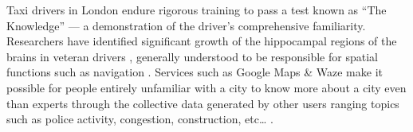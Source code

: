 \documentclass[trackingWork]{subfiles}
\begin{document}
Taxi drivers in London endure rigorous training to pass a test known as ``The Knowledge''
--- a demonstration of the driver's comprehensive familiarity.
Researchers have identified significant growth of
the hippocampal regions of the brains in veteran drivers%
, generally understood to be responsible for spatial functions such as navigation
\cite{Maguire11042000,Maguire2894,Skok:1999:KML:299513.299625%
,       skok2000managing,Woollett1407,woollett2011acquiring}.
Services such as Google Maps \& Waze make it possible for
people entirely unfamiliar with a city
to know more about a city even than experts through
the collective data generated by other users
ranging topics such as police activity, congestion, construction, etc\dots
\cite{silva2013traffic,hind2014outsmarting}.




\onlyinsubfile{
  \balance{}
  \printbibliography
  \nobalance{}
  }
\end{document}
